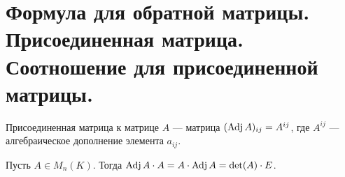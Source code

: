 \section{Формула для обратной матрицы. Присоединенная матрица. Соотношение для присоединенной матрицы.}
\begin{defn}
{\sf Присоединенная матрица} к матрице $ A$ --- матрица $ (\operatorname{Adj} A)_{ij} = A^{ij}$, где $ A^{ij}$ --- алгебраическое дополнение элемента $ a_{ij}$.   
\end{defn}
\begin{thm}
    Пусть $ A \in M_n(K)$. Тогда 
    $
	\operatorname{Adj} A \cdot A = A \cdot \operatorname{Adj} A = \det( A) \cdot E
	$.
\end{thm}
